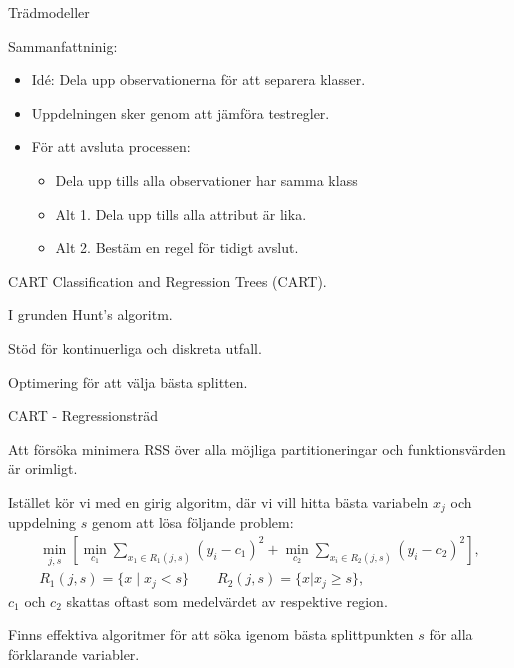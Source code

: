 \documentclass[10pt,english]{beamer}
\begin{document}
\begin{frame}{Trädmodeller}
    
    Sammanfattninig:
    \begin{itemize}
        \item Idé: Dela upp observationerna för att separera klasser.
        \item Uppdelningen sker genom att jämföra testregler.
        \item För att avsluta processen:
        \begin{itemize}
            \item Dela upp tills alla observationer har samma klass
            \item Alt 1. Dela upp tills alla attribut är lika.
            \item Alt 2. Bestäm en regel för tidigt avslut.
        \end{itemize}
    \end{itemize}

\end{frame}

\begin{frame}{CART}
    Classification and Regression Trees (CART).

    I grunden Hunt's algoritm.

    Stöd för kontinuerliga och diskreta utfall.

    Optimering för att välja bästa splitten.
\end{frame}

\begin{frame}{CART - Regressionsträd}
    
    Att försöka minimera RSS över alla möjliga partitioneringar och funktionsvärden är orimligt.

    Istället kör vi med en girig algoritm, där vi vill hitta bästa variabeln $x_j$ och uppdelning $s$ genom att lösa följande problem:
    \begin{align*}
        \min_{j,s} \left[ \min_{c_1} \sum_{x_1 \in R_1(j,s)} (y_i - c_1)^2 + \min_{c_2} \sum_{x_i \in R_2(j,s)} (y_i - c_2)^2 \right], \\
        R_1(j,s) = \{x \mid x_j < s\} \qquad R_2(j,s) = \{x | x_j \geq s\},
    \end{align*}
    $c_1$ och $c_2$ skattas oftast som medelvärdet av respektive region.
    
    Finns effektiva algoritmer för att söka igenom bästa splittpunkten $s$ för alla förklarande variabler.
    
\end{frame}
\end{document}
